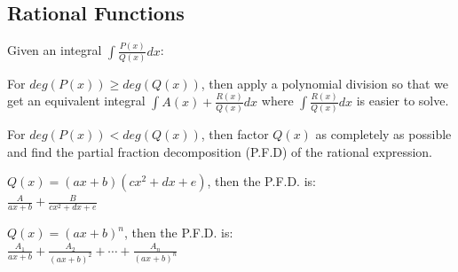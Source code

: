 \documentclass[8pt,a4paper]{extarticle}     %
\theoremstyle{definition}
\theoremstyle{definition}
\theoremstyle{definition}
\begin{document}
\begin{multicols}{4}
\subsection{Rational Functions}
Given an integral $\int \frac{P(x)}{Q(x)}dx$:
\begin{bulletlist}
	\item For $deg(P(x)) \geq deg(Q(x))$, then apply a polynomial division so that we get an equivalent integral $\int A(x) + \frac{R(x)}{Q(x)}dx$ where $\int \frac{R(x)}{Q(x)}dx$ is easier to solve. 
	\item For $deg(P(x)) < deg(Q(x))$, then factor $Q(x)$ as completely as possible and find the partial fraction decomposition (P.F.D) of the rational expression.  	
	\begin{numberlist}
		\item $Q(x) = (ax+b)(cx^2+dx+e)$, then the P.F.D. is:\\ $\frac{A}{ax+b} + \frac{B}{cx^2+dx+e}$
		\item $Q(x) = (ax+b)^n $, then the P.F.D. is:\\ $ \frac{A_1}{ax+b}+\frac{A_2}{(ax+b)^2}+ \cdots + \frac{A_n}{(ax+b)^n}$
	\end{numberlist}
\end{bulletlist} 


\end{multicols}
\end{document}
